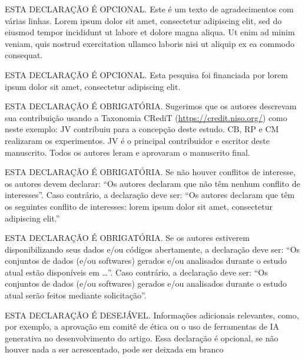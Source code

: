 \documentclass[portuguese]{sbc2025}%
\begin{document}

 
 
 
 
 

\begin{declarations}

\begin{acknowledgements}
ESTA DECLARAÇÃO É OPCIONAL. Este é um texto de agradecimentos com várias linhas. Lorem ipsum dolor sit amet, consectetur adipiscing elit, sed do eiusmod tempor incididunt ut labore et dolore magna aliqua. Ut enim ad minim veniam, quis nostrud exercitation ullamco laboris nisi ut aliquip ex ea commodo consequat.
\end{acknowledgements}

\begin{funding}
ESTA DECLARAÇÃO É OPCIONAL. Esta pesquisa foi financiada por lorem ipsum dolor sit amet, consectetur adipiscing elit.
\end{funding}

\begin{contributions}
ESTA DECLARAÇÃO É OBRIGATÓRIA. Sugerimos que os autores descrevam sua contribuição usando a Taxonomia CRediT (\href{https://credit.niso.org/}{https://credit.niso.org/}) como neste exemplo: JV contribuiu para a concepção deste estudo. CB, RP e CM realizaram os experimentos. JV é o principal contribuidor e escritor deste manuscrito. Todos os autores leram e aprovaram o manuscrito final. 
\end{contributions}

\begin{interests}
ESTA DECLARAÇÃO É OBRIGATÓRIA. Se não houver conflitos de interesse, os autores devem declarar: ``Os autores declaram que não têm nenhum conflito de interesses''. Caso contrário, a declaração deve ser: ``Os autores declaram que têm os seguintes conflito de interesses: lorem ipsum dolor sit amet, consectetur adipiscing elit.''
\end{interests}

\begin{materials}
ESTA DECLARAÇÃO É OBRIGATÓRIA. 
  Se os autores estiverem disponibilizando seus dados e/ou códigos
  abertamente, a declaração deve ser: ``Os conjuntos de dados (e/ou
  softwares) gerados e/ou analisados durante o estudo atual estão
  disponíveis em \ldots''. Caso contrário, a declaração deve ser: ``Os
  conjuntos de dados (e/ou softwares) gerados e/ou analisados durante
  o estudo atual serão feitos mediante solicitação''.
\end{materials}

\begin{furtherinformation}
ESTA DECLARAÇÃO É DESEJÁVEL. Informações adicionais relevantes, como, por exemplo, a aprovação em comitê de ética ou o uso de ferramentas de IA generativa no desenvolvimento do artigo. Essa declaração é opcional, se não houver nada a ser acrescentado, pode ser deixada em branco
\end{furtherinformation}
\end{declarations}





\appendix


\end{document}

